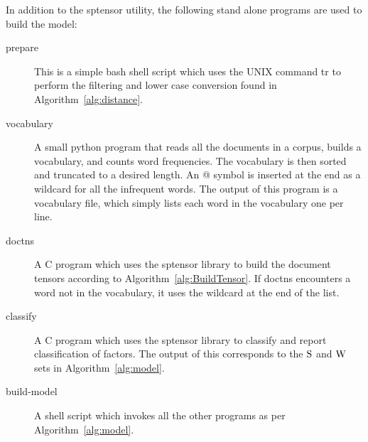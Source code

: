 \documentclass[../ut-dissertation.tex]{subfiles}
\begin{document}
In addition to the sptensor utility, the following stand alone
programs are used to build the model:
\begin{description}
\item[prepare] This is a simple bash shell script which uses the UNIX
  command tr to perform the filtering and lower case conversion found
  in Algorithm~\ref{alg:distance}.
\item[vocabulary] A small python program that reads all the documents
  in a corpus, builds a vocabulary, and counts word frequencies.  The
  vocabulary is then sorted and truncated to a desired length.  An @
  symbol is inserted at the end as a wildcard for all the infrequent
  words.  The output of this program is a vocabulary file, which
  simply lists each word in the vocabulary one per line.
\item[doctns] A C program which uses the sptensor library to build the
  document tensors according to Algorithm~\ref{alg:BuildTensor}.  If
  doctns encounters a word not in the vocabulary, it uses the wildcard
  at the end of the list.
\item[classify] A C program which uses the sptensor library to
  classify and report classification of factors.  The output of this
  corresponds to the $\mathrm{S}$ and $\mathrm{W}$ sets in Algorithm~\ref{alg:model}.
\item[build-model] A shell script which invokes all the other
  programs as per Algorithm~\ref{alg:model}.
\end{description}
\end{document}
